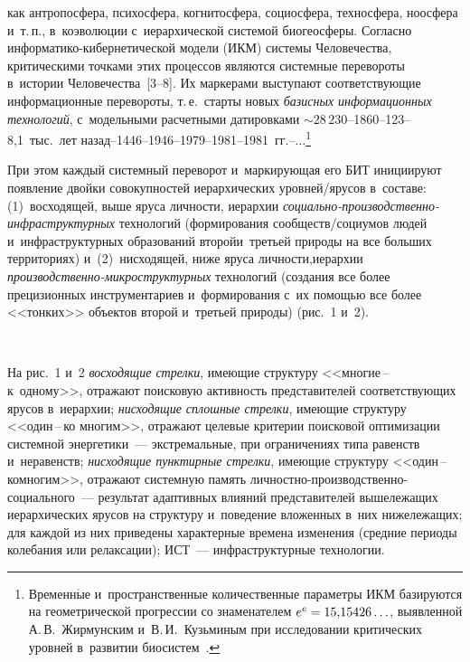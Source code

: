 \begin{multicols}{2}

\noindent
 как антропосфера, психосфера, 
когнитосфера, социосфера, техносфера, ноосфера и~т.\,п., в~коэволюции 
с~иерархической системой биогеосферы. Согласно  
ин\-фор\-ма\-ти\-ко-ки\-бер\-не\-ти\-че\-ской модели (ИКМ) сис\-те\-мы 
Человечества, критическими точками этих процессов являются системные 
перевороты в~истории Человечества~[3--8]. Их маркерами выступают 
соответствующие информационные перевороты, т.\,е.\ старты новых 
\textit{базисных информационных технологий}, с~модельными 
расчетными датировками $\sim28\,230$--1860--123--8,1~тыс.\ лет  
назад--1446--1946--1979--1981--1981~гг.--$\ldots$\footnote{Временн$\acute{\mbox{ы}}$е 
и~пространственные количественные параметры ИКМ базируются на геометрической 
прогрессии со знаменателем $e^e\hm= 15{,}15426\ldots$, выявленной А.\,В.~Жирмунским 
и~В.\,И.~Кузьминым при исследовании критических уровней в~развитии  
био\-сис\-тем~\cite{9-gri}.}
  
  При этом каждый системный переворот и~маркирующая его БИТ 
инициируют появление двойки совокупностей иерархических  
уров\-ней/яру\-сов в~составе: (1)~восходящей, выше яруса личности, иерархии 
\textit{со\-ци\-аль\-но-про\-из\-вод\-ст\-вен\-но-инфра\-струк\-тур\-ных} 
технологий (формирования со\-об\-ществ/со\-ци\-умов людей и~инфраструктурных 
образований второй\linebreak и~третьей природы на все больших тер\-ри\-то\-ри\-ях) 
и~(2)~нисходящей, ниже яруса личности,\linebreak иерархии  
\textit{про\-из\-вод\-ст\-вен\-но-мик\-ро\-струк\-тур\-ных} технологий 
(создания все более прецизионных \mbox{инструментариев} и~формирования с~их 
помощью все более <<тонких>> объектов второй и~третьей природы) 
(рис.~1 и~2).

\begin{figure*} %
\vspace*{1pt}
\begin{center}  
\mbox{%
\epsfxsize=162.938mm
}
\end{center}
\end{figure*}

На рис.~1 и~2  \textit{восходящие стрелки}, име\-ющие структуру  
<<мно\-гие\,--\,к~од\-но\-му>>, отражают поисковую ак\-тив\-ность представителей 
соответствующих ярусов в~иерархии; \textit{нисходящие сплош\-ные стрелки}, име\-ющие 
структуру <<один\,--\,ко мно\-гим>>, отражают целевые критерии поисковой оптимизации 
системной энергетики~--- экстремальные, при ограничениях типа равенств и~неравенств; 
\textit{нисходящие пунктирные стрелки}, име\-ющие структуру <<один\,--\,ко\linebreak мно\-гим>>, 
отражают сис\-тем\-ную память лич\-ност\-но-про\-из\-вод\-ствен\-но-со\-ци\-аль\-но\-го~--- 
результат адап\-тив\-ных влияний представителей вышележащих иерархических ярусов на 
структуру и~поведение вложенных в~них нижележащих; для каждой из них приведены 
характерные времена изменения (средние периоды колебания или релаксации);
 ИСТ~--- инфраструктурные технологии.
  

\end{multicols}
